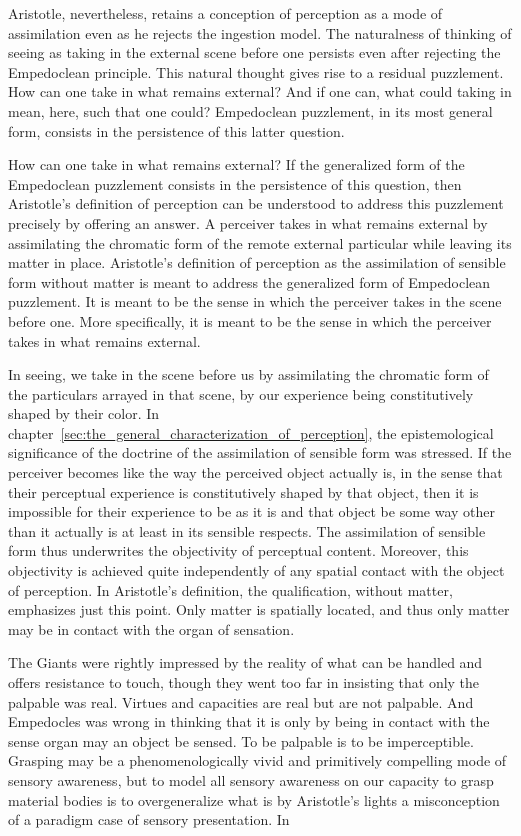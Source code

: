 Aristotle, nevertheless, retains a conception of perception as a mode of assimilation even as he rejects the ingestion model. The naturalness of thinking of seeing as taking in the external scene before one persists even after rejecting the Empedoclean principle. This natural thought gives rise to a residual puzzlement. How can one take in what remains external? And if one can, what could taking in mean, here, such that one could? Empedoclean puzzlement, in its most general form, consists in the persistence of this latter question. 

How can one take in what remains external? If the generalized form of the Empedoclean puzzlement consists in the persistence of this question, then Aristotle's definition of perception can be understood to address this puzzlement precisely by offering an answer. A perceiver takes in what remains external by assimilating the chromatic form of the remote external particular while leaving its matter in place. Aristotle's definition of perception as the assimilation of sensible form without matter is meant to address the generalized form of Empedoclean puzzlement. It is meant to be the sense in which the perceiver takes in the scene before one. More specifically, it is meant to be the sense in which the perceiver takes in what remains external. 

In seeing, we take in the scene before us by assimilating the chromatic form of the particulars arrayed in that scene, by our experience being constitutively shaped by their color. In chapter~\ref{sec:the_general_characterization_of_perception}, the epistemological significance of the doctrine of the assimilation of sensible form was stressed. If the perceiver becomes like the way the perceived object actually is, in the sense that their perceptual experience is constitutively shaped by that object, then it is impossible for their experience to be as it is and that object be some way other than it actually is at least in its sensible respects. The assimilation of sensible form thus underwrites the objectivity of perceptual content. Moreover, this objectivity is achieved quite independently of any spatial contact with the object of perception. In Aristotle's definition, the qualification, without matter, emphasizes just this point. Only matter is spatially located, and thus only matter may be in contact with the organ of sensation. 


The Giants were rightly impressed by the reality of what can be handled and offers resistance to touch, though they went too far in insisting that only the palpable was real. Virtues and capacities are real but are not palpable. And Empedocles was wrong in thinking that it is only by being in contact with the sense organ may an object be sensed. To be palpable is to be imperceptible. Grasping may be a phenomenologically vivid and primitively compelling mode of sensory awareness, but to model all sensory awareness on our capacity to grasp material bodies is to overgeneralize what is by Aristotle's lights a misconception of a paradigm case of sensory presentation. In 

